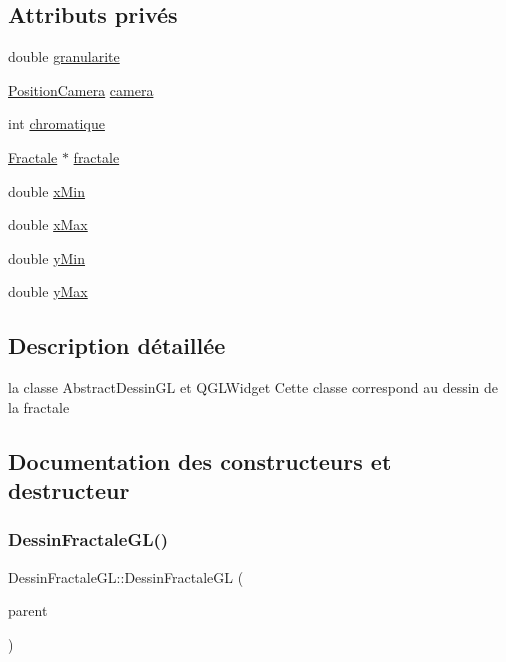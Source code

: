 \subsection*{Attributs privés}
\begin{DoxyCompactItemize}
\item 
double \hyperlink{classDessinFractaleGL_ada85c1b2e0cc4485d79a60258a422521}{granularite}
\item 
\hyperlink{structPositionCamera}{Position\+Camera} \hyperlink{classDessinFractaleGL_acdc8b205dee41342ea84c84ea1ec96cb}{camera}
\item 
int \hyperlink{classDessinFractaleGL_a63be7c470d6af10375e6c1fa96c9fbf1}{chromatique}
\item 
\hyperlink{classFractale}{Fractale} $\ast$ \hyperlink{classDessinFractaleGL_a71b27433fd38422b0cf4169e8d74f990}{fractale}
\item 
double \hyperlink{classDessinFractaleGL_a3905f437ed2de9bfd3b3f2c2d01f8dff}{x\+Min}
\item 
double \hyperlink{classDessinFractaleGL_a3f5773ce4bc1f55a69b7b70ef1d7f958}{x\+Max}
\item 
double \hyperlink{classDessinFractaleGL_ab5c06a94ea9da9168b17b64f9d0cfe7f}{y\+Min}
\item 
double \hyperlink{classDessinFractaleGL_a4b797fc2cb63897aa2006ea2ffd8da56}{y\+Max}
\end{DoxyCompactItemize}


\subsection{Description détaillée}
la classe Abstract\+Dessin\+GL et Q\+G\+L\+Widget Cette classe correspond au dessin de la fractale 

\subsection{Documentation des constructeurs et destructeur}
\mbox{\label{classDessinFractaleGL_a20c8b74a98b58180ab241e41fdaa3649}} 
\subsubsection{\texorpdfstring{Dessin\+Fractale\+G\+L()}{DessinFractaleGL()}\hspace{0.1cm}{\footnotesize\ttfamily [1/2]}}
{\footnotesize\ttfamily Dessin\+Fractale\+G\+L\+::\+Dessin\+Fractale\+GL (\begin{DoxyParamCaption}\item[{Q\+Widget $\ast$}]{parent }\end{DoxyParamCaption})}

